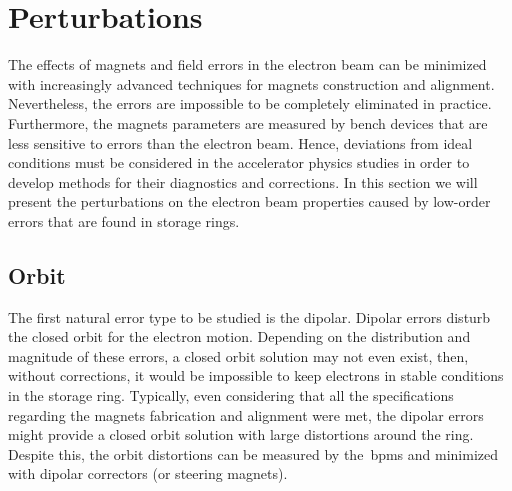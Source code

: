 
\section{Perturbations}\label{perturbations}
The effects of magnets and field errors in the electron beam can be minimized with increasingly advanced techniques for magnets construction and alignment. Nevertheless, the errors are impossible to be completely eliminated in practice. Furthermore, the magnets parameters are measured by bench devices that are less sensitive to errors than the electron beam. Hence, deviations from ideal conditions must be considered in the accelerator physics studies in order to develop methods for their diagnostics and corrections. In this section we will present the perturbations on the electron beam properties caused by low-order errors that are found in storage rings. 
\subsection{Orbit}\label{subset:orbit}
The first natural error type to be studied is the dipolar. Dipolar errors disturb the closed orbit for the electron motion. Depending on the distribution and magnitude of these errors, a closed orbit solution may not even exist, then, without corrections, it would be impossible to keep electrons in stable conditions in the storage ring. Typically, even considering that all the specifications regarding the magnets fabrication and alignment were met, the dipolar errors might provide a closed orbit solution with large distortions around the ring. Despite this, the orbit distortions can be measured by the~\gls{bpm}s and minimized with dipolar correctors (or steering magnets).

